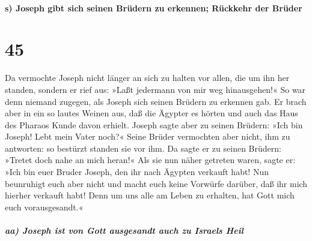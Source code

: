 \hypertarget{s-joseph-gibt-sich-seinen-bruxfcdern-zu-erkennen-ruxfcckkehr-der-bruxfcder}{%
\paragraph{s) Joseph gibt sich seinen Brüdern zu erkennen; Rückkehr der
Brüder}\label{s-joseph-gibt-sich-seinen-bruxfcdern-zu-erkennen-ruxfcckkehr-der-bruxfcder}}

\hypertarget{section-44}{%
\section{45}\label{section-44}}

 Da vermochte Joseph nicht länger an sich zu halten vor
allen, die um ihn her standen, sondern er rief aus: »Laßt jedermann von
mir weg hinausgehen!« So war denn niemand zugegen, als Joseph sich
seinen Brüdern zu erkennen gab.  Er brach aber in ein so
lautes Weinen aus, daß die Ägypter es hörten und auch das Haus des
Pharaos Kunde davon erhielt.  Joseph sagte aber zu seinen
Brüdern: »Ich bin Joseph! Lebt mein Vater noch?« Seine Brüder vermochten
aber nicht, ihm zu antworten: so bestürzt standen sie vor ihm.
 Da sagte er zu seinen Brüdern: »Tretet doch nahe an mich
heran!« Als sie nun näher getreten waren, sagte er: »Ich bin euer Bruder
Joseph, den ihr nach Ägypten verkauft habt!  Nun
beunruhigt euch aber nicht und macht euch keine Vorwürfe darüber, daß
ihr mich hierher verkauft habt! Denn um uns alle am Leben zu erhalten,
hat Gott mich euch vorausgesandt.«

\hypertarget{aa-joseph-ist-von-gott-ausgesandt-auch-zu-israels-heil}{%
\subparagraph{aa) Joseph ist von Gott ausgesandt auch zu Israels
Heil}\label{aa-joseph-ist-von-gott-ausgesandt-auch-zu-israels-heil}}

